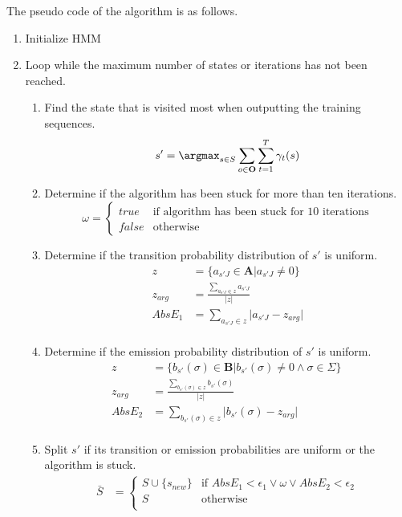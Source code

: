 The pseudo code of the algorithm is as follows.

\begin{enumerate}
\item Initialize HMM
\item Loop while the maximum number of states or iterations has not been reached.
\indent \begin{enumerate}
	\item 	Find the state that is visited most when outputting the training sequences.
	$$s' = \argmax_{s \in S}\sum_{o \in \mathbf{O}}\sum_{t=1}^{T}\gamma_t(s)$$ 
	\item Determine if the algorithm has been stuck for more than ten iterations.
	$$ \omega = \begin{cases}
		true &\text{if algorithm has been stuck for 10 iterations} \\
		false &\text{otherwise}
	\end{cases} $$
	\item Determine if the transition probability distribution of $s'$ is uniform.
	\begin{align*}
	z &= \{a_{s'J} \in \mathbf{A} \vert a_{s'J} \neq 0\} \\
	z_{arg} &= \frac{\sum_{a_{s'J} \in z} a_{s'J}}{\vert z \vert} \\
	AbsE_1 &= \sum_{a_{s'J} \in z} \vert a_{s'J} - z_{arg} \vert \\
	\end{align*}
	\item Determine if the emission probability distribution of $s'$ is uniform.
	\begin{align*}
	z &= \{b_{s'}(\sigma) \in \mathbf{B} \vert b_{s'}(\sigma) \neq 0 \wedge \sigma \in \Sigma\} \ \\
	z_{arg} &= \frac{\sum_{b_{s'}(\sigma) \in z} b_{s'}(\sigma)}{\vert z \vert} \\
	AbsE_2 &= \sum_{b_{s'}(\sigma) \in z} \vert b_{s'}(\sigma) - z_{arg} \vert \\
	\end{align*}
	\item Split $s'$ if its transition or emission probabilities are uniform or the algorithm is stuck. 
	\begin{align*}
	\bar{S} &= \begin{cases}
		S \cup \{ s_{new} \} &\text{if } AbsE_1 < \epsilon_1 \vee \omega \vee AbsE_2 < \epsilon_2 \\
		S	&\text{otherwise} \\
	\end{cases} \\

\end{align*}
\end{enumerate}
\end{enumerate}
